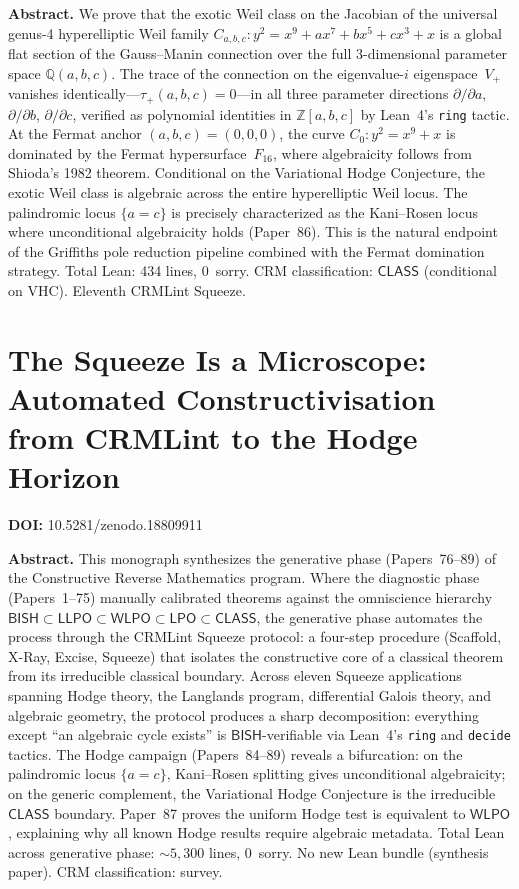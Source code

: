 \documentclass[11pt,a4paper]{article}
\begin{document}
\bigskip
\noindent\textbf{Abstract.}
We prove that the exotic Weil class on the Jacobian of the universal genus-4 hyperelliptic Weil family $C_{a,b,c}\colon y^2 = x^9 + ax^7 + bx^5 + cx^3 + x$ is a global flat section of the Gauss--Manin connection over the full 3-dimensional parameter space $\mathbb{Q}(a,b,c)$. The trace of the connection on the eigenvalue-$i$ eigenspace~$V_+$ vanishes identically---$\tau_+(a,b,c) = 0$---in all three parameter directions $\partial/\partial a$, $\partial/\partial b$, $\partial/\partial c$, verified as polynomial identities in $\mathbb{Z}[a,b,c]$ by Lean~4's \texttt{ring} tactic. At the Fermat anchor $(a,b,c) = (0,0,0)$, the curve $C_0\colon y^2 = x^9 + x$ is dominated by the Fermat hypersurface~$F_{16}$, where algebraicity follows from Shioda's 1982 theorem. Conditional on the Variational Hodge Conjecture, the exotic Weil class is algebraic across the entire hyperelliptic Weil locus. The palindromic locus $\{a = c\}$ is precisely characterized as the Kani--Rosen locus where unconditional algebraicity holds (Paper~86). This is the natural endpoint of the Griffiths pole reduction pipeline combined with the Fermat domination strategy. Total Lean: 434 lines, 0~sorry. CRM classification: $\mathsf{CLASS}$ (conditional on VHC). Eleventh CRMLint Squeeze.

\newpage

\section{The Squeeze Is a Microscope: Automated Constructivisation from CRMLint to the Hodge Horizon}
\label{sec:p90}
\textbf{DOI:} 10.5281/zenodo.18809911

\bigskip
\noindent\textbf{Abstract.}
This monograph synthesizes the generative phase (Papers~76--89) of the Constructive Reverse Mathematics program. Where the diagnostic phase (Papers~1--75) manually calibrated theorems against the omniscience hierarchy $\mathsf{BISH} \subset \mathsf{LLPO} \subset \mathsf{WLPO} \subset \mathsf{LPO} \subset \mathsf{CLASS}$, the generative phase automates the process through the CRMLint Squeeze protocol: a four-step procedure (Scaffold, X-Ray, Excise, Squeeze) that isolates the constructive core of a classical theorem from its irreducible classical boundary. Across eleven Squeeze applications spanning Hodge theory, the Langlands program, differential Galois theory, and algebraic geometry, the protocol produces a sharp decomposition: everything except ``an algebraic cycle exists'' is $\mathsf{BISH}$-verifiable via Lean~4's \texttt{ring} and \texttt{decide} tactics. The Hodge campaign (Papers~84--89) reveals a bifurcation: on the palindromic locus $\{a = c\}$, Kani--Rosen splitting gives unconditional algebraicity; on the generic complement, the Variational Hodge Conjecture is the irreducible $\mathsf{CLASS}$ boundary. Paper~87 proves the uniform Hodge test is equivalent to $\mathsf{WLPO}$, explaining why all known Hodge results require algebraic metadata. Total Lean across generative phase: ${\sim}5{,}300$ lines, 0~sorry. No new Lean bundle (synthesis paper). CRM classification: survey.
\end{document}
